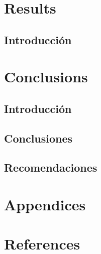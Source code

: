 \documentclass[
  english]{revcoles}
\begin{document}
\section{Results}

\subsection{Introducción}

\section{Conclusions}

\subsection{Introducción}

\subsection{Conclusiones}

\subsection{Recomendaciones}

\section{Appendices}

\section*{References}
\end{document}
